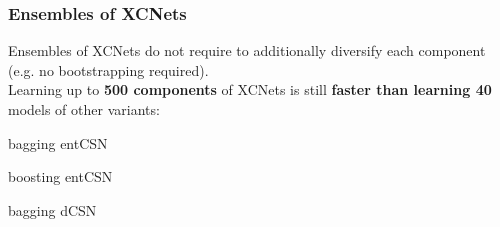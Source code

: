 \documentclass[xcolor={usenames,dvipsnames,svgnames}, compress]{beamer}
\begin{document}
\begin{frame}[t]
  \frametitle{Ensembles of XCNets}
  \small

  
  Ensembles of XCNets do not require to additionally
  diversify each component (e.g. no bootstrapping required).\\[10pt]

  Learning up to \textbf{500 components} of XCNets is still \textbf{faster
than learning 40} models of other variants:

\vspace{10pt}

    \begin{center}
      \begin{minipage}{0.9\linewidth}
        \begin{description}[align=parright]
        \item[\textbf{\textsf{CNet}}$_{\mathsf{bag}}$]
          bagging \textsf{entCSN}~\parencite{Rahman2016a}\par
        \item[\textbf{\textsf{CNet}}$_{\mathsf{boost}}$]
          boosting \textsf{entCSN}~\parencite{Rahman2016a}\par
        \item[\textbf{\textsf{dCSN}}$^{k}$]
          bagging \textsf{dCSN}~\parencite{DiMauro2015a,DiMauro2015b}\par
        \end{description}
      \end{minipage}
    \end{center}
  \end{frame}
\end{document}

